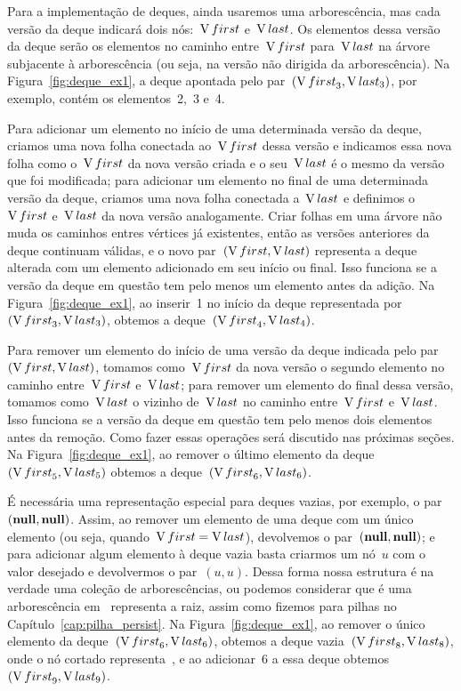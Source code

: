 \documentclass[main.tex]{subfiles}
\begin{document}
Para a implementação de deques, ainda usaremos uma arborescência, mas cada versão da deque indicará dois nós:~$\operatorname{V}{first}$ e~$\operatorname{V}{last}$. Os elementos dessa versão da deque serão os elementos no caminho entre~$\operatorname{V}{first}$ para~$\operatorname{V}{last}$ na árvore subjacente à arborescência (ou seja, na versão não dirigida da arborescência). Na Figura~\ref{fig:deque_ex1}, a deque apontada pelo par~$(\operatorname{V}{first}_3, \operatorname{V}{last}_3)$, por exemplo, contém os elementos~2,~3 e~4.

Para adicionar um elemento no início de uma determinada versão da deque, criamos uma nova folha conectada ao~$\operatorname{V}{first}$ dessa versão e indicamos essa nova folha como o~$\operatorname{V}{first}$ da nova versão criada e o seu~$\operatorname{V}{last}$ é o mesmo da versão que foi modificada; para adicionar um elemento no final de uma determinada versão da deque, criamos uma nova folha conectada a~$\operatorname{V}{last}$ e definimos o~$\operatorname{V}{first}$ e~$\operatorname{V}{last}$ da nova versão analogamente. Criar folhas em uma árvore não muda os caminhos entres vértices já existentes, então as versões anteriores da deque continuam válidas, e o novo par~$(\operatorname{V}{first}, \operatorname{V}{last})$ representa a deque alterada com um elemento adicionado em seu início ou final. Isso funciona se a versão da deque em questão tem pelo menos um elemento antes da adição. Na Figura~\ref{fig:deque_ex1}, ao inserir~1 no início da deque representada por~$(\operatorname{V}{first}_3, \operatorname{V}{last_3})$, obtemos a deque~$(\operatorname{V}{first}_4, \operatorname{V}{last}_4)$.

Para remover um elemento do início de uma versão da deque indicada pelo par~$(\operatorname{V}{first}, \operatorname{V}{last})$, tomamos como~$\operatorname{V}{first}$ da nova versão o segundo elemento no caminho entre~$\operatorname{V}{first}$ e~$\operatorname{V}{last}$; para remover um elemento do final dessa versão, tomamos como~$\operatorname{V}{last}$ o vizinho de~$\operatorname{V}{last}$ no caminho entre~$\operatorname{V}{first}$ e~$\operatorname{V}{last}$. Isso funciona se a versão da deque em questão tem pelo menos dois elementos antes da remoção. Como fazer essas operações será discutido nas próximas seções. Na Figura~\ref{fig:deque_ex1}, ao remover o último elemento da deque~$(\operatorname{V}{first}_5, \operatorname{V}{last}_5)$ obtemos a deque~$(\operatorname{V}{first}_6, \operatorname{V}{last}_6)$.

É necessária uma representação especial para deques vazias, por exemplo, o par~$(\textbf{null}, \textbf{null})$. Assim, ao remover um elemento de uma deque com um único elemento (ou seja, quando~$\operatorname{V}{first}=\operatorname{V}{last}$), devolvemos o par~$(\textbf{null}, \textbf{null})$; e para adicionar algum elemento à deque vazia basta criarmos um nó~$u$ com o valor desejado e devolvermos o par~$(u, u)$. Dessa forma nossa estrutura é na verdade uma coleção de arborescências, ou podemos considerar que é uma arborescência em~ representa a raiz, assim como fizemos para pilhas no Capítulo~\ref{cap:pilha_persist}. Na Figura~\ref{fig:deque_ex1}, ao remover o único elemento da deque~$(\operatorname{V}{first}_6, \operatorname{V}{last}_6)$, obtemos a deque vazia~$(\operatorname{V}{first}_8, \operatorname{V}{last}_8)$, onde o nó cortado representa~, e ao adicionar~6 a essa deque obtemos~$(\operatorname{V}{first}_9, \operatorname{V}{last}_9)$.
\end{document}
